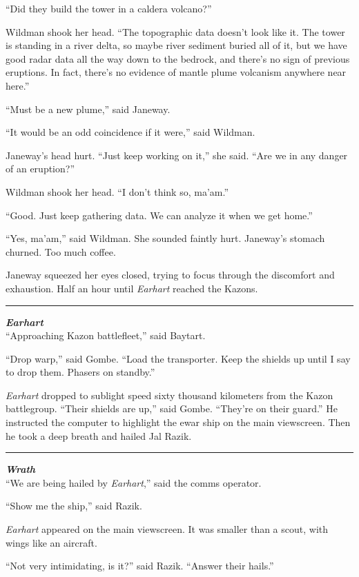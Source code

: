 \documentclass[twoside,letterpaper,12pt]{memoir}
\begin{document}
``Did they build the tower in a caldera volcano?''

Wildman shook her head. ``The topographic data doesn't look like it. The tower is standing in a river delta, so maybe river sediment buried all of it, but we have good radar data all the way down to the bedrock, and there's no sign of previous eruptions. In fact, there's no evidence of mantle plume volcanism anywhere near here.''

``Must be a new plume,'' said Janeway.

``It would be an odd coincidence if it were,'' said Wildman.

Janeway's head hurt. ``Just keep working on it,'' she said. ``Are we in any danger of an eruption?''

Wildman shook her head. ``I don't think so, ma'am.''

``Good. Just keep gathering data. We can analyze it when we get home.''

``Yes, ma'am,'' said Wildman. She sounded faintly hurt. Janeway's stomach churned. Too much coffee.

Janeway squeezed her eyes closed, trying to focus through the discomfort and exhaustion. Half an hour until \textit{Earhart} reached the Kazons.

\fancybreak{\rule{3cm}{0.4 pt}}
\noindent\textit{\textbf{Earhart}}\\

``Approaching Kazon battlefleet,'' said Baytart.

``Drop warp,'' said Gombe. ``Load the transporter. Keep the shields up until I say to drop them. Phasers on standby.''

\textit{Earhart} dropped to sublight speed sixty thousand kilometers from the Kazon battlegroup. ``Their shields are up,'' said Gombe. ``They're on their guard.'' He instructed the computer to highlight the ewar ship on the main viewscreen. Then he took a deep breath and hailed Jal Razik.

\fancybreak{\rule{3cm}{0.4 pt}}
\noindent\textit{\textbf{Wrath}}\\

``We are being hailed by \textit{Earhart},'' said the comms operator.

``Show me the ship,'' said Razik.

\textit{Earhart} appeared on the main viewscreen. It was smaller than a scout, with wings like an aircraft.

``Not very intimidating, is it?'' said Razik. ``Answer their hails.''
\end{document}
